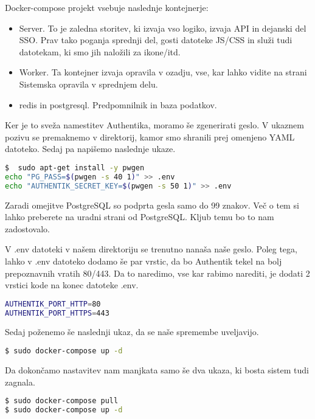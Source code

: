 \documentclass[a4paper,12pt,openright]{book}
\begin{document}
Docker-compose projekt vsebuje naslednje kontejnerje:

\begin{itemize}
    \item Server. To je zaledna storitev, ki izvaja vso logiko, izvaja API in dejanski del SSO. Prav tako poganja sprednji del, gosti datoteke JS/CSS in služi tudi datotekam, ki smo jih naložili za ikone/itd.
    \item Worker. Ta kontejner izvaja opravila v ozadju, vse, kar lahko vidite na strani Sistemska opravila v sprednjem delu.
    \item redis in postgresql. Predpomnilnik in baza podatkov.
\end{itemize}

Ker je to sveža namestitev Authentika, moramo še zgenerirati geslo. V ukaznem pozivu se premaknemo v direktorij, kamor smo shranili prej omenjeno YAML datoteko. Sedaj pa napišemo naslednje ukaze.

\begin{lstlisting}[language=bash]
$  sudo apt-get install -y pwgen
echo "PG_PASS=$(pwgen -s 40 1)" >> .env
echo "AUTHENTIK_SECRET_KEY=$(pwgen -s 50 1)" >> .env
\end{lstlisting}

Zaradi omejitve PostgreSQL so podprta gesla samo do 99 znakov. Več o tem si lahko preberete na uradni strani od PostgreSQL\cite{PostgreSQL}. Kljub temu bo to nam zadostovalo. \newline

V .env datoteki v našem direktoriju se trenutno nanaša naše geslo. Poleg tega, lahko v .env datoteko dodamo še par vrstic, da bo Authentik tekel na bolj prepoznavnih vratih 80/443. Da to naredimo, vse kar rabimo narediti, je dodati 2 vrstici kode na konec datoteke .env.

\begin{lstlisting}[language=bash]
AUTHENTIK_PORT_HTTP=80
AUTHENTIK_PORT_HTTPS=443
\end{lstlisting}

Sedaj poženemo še naslednji ukaz, da se naše spremembe uveljavijo. 

\begin{lstlisting}[language=bash]
$ sudo docker-compose up -d
\end{lstlisting}

Da dokončamo nastavitev nam manjkata samo še dva ukaza, ki bosta sistem tudi zagnala.

\begin{lstlisting}[language=bash]
$ sudo docker-compose pull
$ sudo docker-compose up -d
\end{lstlisting}
\end{document}

